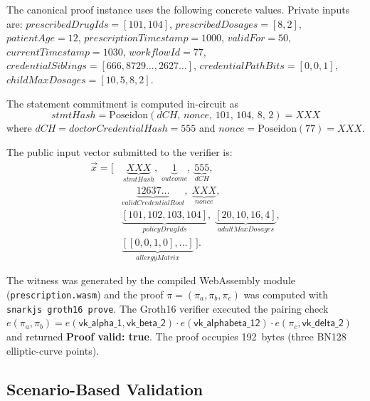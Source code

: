 \documentclass[journal]{IEEEtran}
\begin{document}
The canonical proof instance uses the following concrete values.
Private inputs are:
$\mathit{prescribedDrugIds} = [101, 104]$,
$\mathit{prescribedDosages} = [8, 2]$,
$\mathit{patientAge} = 12$,
$\mathit{prescriptionTimestamp} = 1000$,
$\mathit{validFor} = 50$,
$\mathit{currentTimestamp} = 1030$,
$\mathit{workflowId} = 77$,
$\mathit{credentialSiblings} = [666, 8729\ldots, 2627\ldots]$,
$\mathit{credentialPathBits} = [0, 0, 1]$,
$\mathit{childMaxDosages} = [10, 5, 8, 2]$.

\noindent
The statement commitment is computed in-circuit as
\begin{equation}
\mathit{stmtHash}
  = \mathrm{Poseidon}(\mathit{dCH},\,\mathit{nonce},\,101,\,104,\,8,\,2)
  = \mathit{XXX}
\label{eq:stmthash-instance}
\end{equation}
where $\mathit{dCH} = \mathit{doctorCredentialHash} = 555$ and
$\mathit{nonce} = \mathrm{Poseidon}(77) = \mathit{XXX}$.

\noindent
The public input vector submitted to the verifier is:
\begin{align*}
\vec{x} = [&\,\underbrace{\mathit{XXX}}_{\mathit{stmtHash}},\;
             \underbrace{1}_{\mathit{outcome}},\;
             \underbrace{555}_{\mathit{dCH}},\\
           &\underbrace{12637\ldots}_{\mathit{validCredentialRoot}},\;
            \underbrace{\mathit{XXX}}_{\mathit{nonce}},\\
           &\underbrace{[101,102,103,104]}_{\mathit{policyDrugIds}},\;
            \underbrace{[20,10,16,4]}_{\mathit{adultMaxDosages}},\\
           &\underbrace{[[0,0,1,0],\ldots]}_{\mathit{allergyMatrix}}\,].
\end{align*}

The witness was generated by the compiled WebAssembly module
(\texttt{prescription.wasm}) and the proof $\pi = (\pi_a, \pi_b, \pi_c)$
was computed with \texttt{snarkjs groth16 prove}.
The Groth16 verifier executed the pairing check
$e(\pi_a, \pi_b) = e(\mathsf{vk\_alpha\_1}, \mathsf{vk\_beta\_2}) \cdot
e(\mathsf{vk\_alphabeta\_12}) \cdot
e(\pi_c, \mathsf{vk\_delta\_2})$ and returned \textbf{Proof valid: true}.
The proof occupies 192~bytes (three BN128 elliptic-curve points).

\subsection{Scenario-Based Validation}
\label{ss:scenarios}
\end{document}
